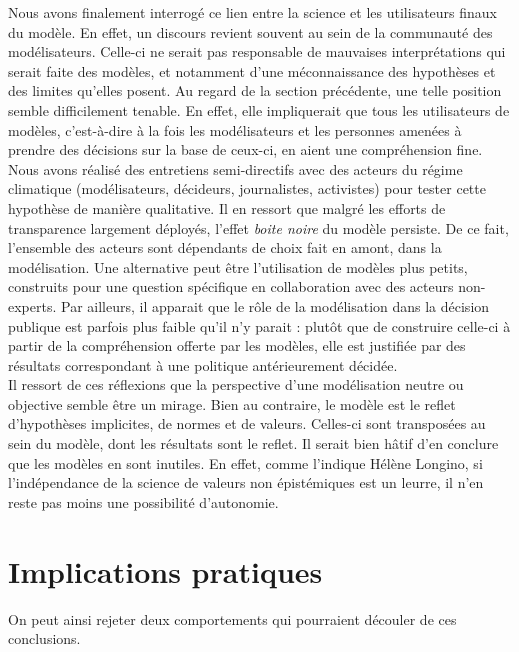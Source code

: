 Nous avons finalement interrogé ce lien entre la science et les utilisateurs finaux du modèle. En effet, un discours revient souvent au sein de la communauté des modélisateurs. Celle-ci ne serait pas responsable de mauvaises interprétations qui serait faite des modèles, et notamment d'une méconnaissance des hypothèses et des limites qu'elles posent. Au regard de la section précédente, une telle position semble difficilement tenable. En effet, elle impliquerait que tous les utilisateurs de modèles, c'est-à-dire à la fois les modélisateurs et les personnes amenées à prendre des décisions sur la base de ceux-ci, en aient une compréhension fine. Nous avons réalisé des entretiens semi-directifs avec des acteurs du régime climatique (modélisateurs, décideurs, journalistes, activistes) pour tester cette hypothèse de manière qualitative. Il en ressort que malgré les efforts de transparence largement déployés, l'effet \emph{boite noire} du modèle persiste. De ce fait, l'ensemble des acteurs sont dépendants de choix fait en amont, dans la modélisation. Une alternative peut être l'utilisation de modèles plus petits, construits pour une question spécifique en collaboration avec des acteurs non-experts.  Par ailleurs, il apparait que le rôle de la modélisation dans la décision publique est parfois plus faible qu'il n'y parait : plutôt que de construire celle-ci à partir de la compréhension offerte par les modèles, elle est justifiée par des résultats correspondant à une politique antérieurement décidée. \\

Il ressort de ces réflexions que la perspective d'une modélisation neutre ou objective semble être un mirage. Bien au contraire, le modèle est le reflet d'hypothèses implicites, de normes et de valeurs. Celles-ci sont transposées au sein du modèle, dont les résultats sont le reflet. Il serait bien hâtif d'en conclure que les modèles en sont inutiles. En effet, comme l'indique Hélène Longino, si l'indépendance de la science de valeurs non épistémiques est un leurre, il n'en reste pas moins une possibilité d'autonomie. \\

\section{Implications pratiques}

On peut ainsi rejeter deux comportements qui pourraient découler de ces conclusions. \\

